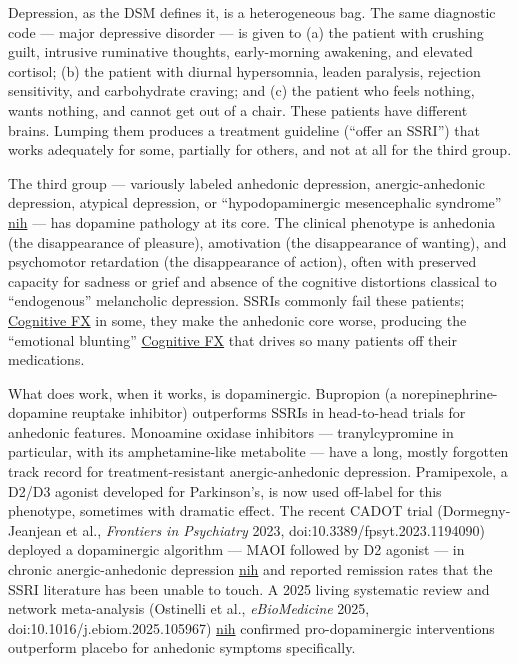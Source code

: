 Depression, as the DSM defines it, is a heterogeneous bag. The same diagnostic code --- major depressive disorder --- is given to (a) the patient with crushing guilt, intrusive ruminative thoughts, early-morning awakening, and elevated cortisol; (b) the patient with diurnal hypersomnia, leaden paralysis, rejection sensitivity, and carbohydrate craving; and (c) the patient who feels nothing, wants nothing, and cannot get out of a chair. These patients have different brains. Lumping them produces a treatment guideline (``offer an SSRI'') that works adequately for some, partially for others, and not at all for the third group.

The third group --- variously labeled anhedonic depression, anergic-anhedonic depression, atypical depression, or ``hypodopaminergic mesencephalic syndrome'' \href{https://www.ncbi.nlm.nih.gov/pmc/articles/PMC10565009/}{nih} --- has dopamine pathology at its core. The clinical phenotype is anhedonia (the disappearance of pleasure), amotivation (the disappearance of wanting), and psychomotor retardation (the disappearance of action), often with preserved capacity for sadness or grief and absence of the cognitive distortions classical to ``endogenous'' melancholic depression. SSRIs commonly fail these patients; \href{https://www.cognitivefxusa.com/blog/patient-guide-to-anhedonia-treatment}{Cognitive FX} in some, they make the anhedonic core worse, producing the ``emotional blunting'' \href{https://www.cognitivefxusa.com/blog/patient-guide-to-anhedonia-treatment}{Cognitive FX} that drives so many patients off their medications.

What does work, when it works, is dopaminergic. Bupropion (a norepinephrine-dopamine reuptake inhibitor) outperforms SSRIs in head-to-head trials for anhedonic features. Monoamine oxidase inhibitors --- tranylcypromine in particular, with its amphetamine-like metabolite --- have a long, mostly forgotten track record for treatment-resistant anergic-anhedonic depression. Pramipexole, a D2/D3 agonist developed for Parkinson's, is now used off-label for this phenotype, sometimes with dramatic effect. The recent CADOT trial (Dormegny-Jeanjean et al., \emph{Frontiers in Psychiatry} 2023, doi:10.3389/fpsyt.2023.1194090) deployed a dopaminergic algorithm --- MAOI followed by D2 agonist --- in chronic anergic-anhedonic depression \href{https://www.ncbi.nlm.nih.gov/pmc/articles/PMC10565009/}{nih} and reported remission rates that the SSRI literature has been unable to touch. A 2025 living systematic review and network meta-analysis (Ostinelli et al., \emph{eBioMedicine} 2025, doi:10.1016/j.ebiom.2025.105967) \href{https://www.ncbi.nlm.nih.gov/pmc/articles/PMC12790147/}{nih} confirmed pro-dopaminergic interventions outperform placebo for anhedonic symptoms specifically.

